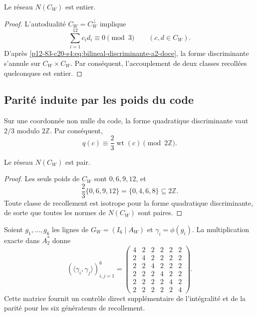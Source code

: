 \begin{lemma}
\label{p12-83-c20-s4:lem:integralidad-pegado-cw}
Le réseau \(N(C_W)\) est entier.
\end{lemma}

\begin{proof}
L'autodualité \(C_W=C_W^\perp\) implique
\[
 \sum_{i=1}^{12}c_id_i\equiv0\pmod3
 \qquad(c,d\in C_W).
\]
D'après \eqref{p12-83-c20-s4:eq:bilineal-discriminante-a2-doce}, la forme discriminante
s'annule sur \(C_W\times C_W\). Par conséquent, l'accouplement de deux classes
recollées quelconques est entier.
\end{proof}

\subsection{Parité induite par les poids du code}

Sur une coordonnée non nulle du code, la forme quadratique discriminante
vaut \(2/3\) modulo \(2\mathbb Z\). Par conséquent,
\begin{equation}
 q(c)\equiv\frac23\operatorname{wt}(c)\pmod{2\mathbb Z}.
 \label{p12-83-c20-s4:eq:cuadratica-discriminante-cw}
\end{equation}

\begin{lemma}
\label{p12-83-c20-s4:lem:paridad-pegado-cw}
Le réseau \(N(C_W)\) est pair.
\end{lemma}

\begin{proof}
Les seuls poids de \(C_W\) sont \(0,6,9,12\), et
\[
 \frac23\{0,6,9,12\}=\{0,4,6,8\}\subseteq2\mathbb Z.
\]
Toute classe de recollement est isotrope pour la forme quadratique discriminante,
de sorte que toutes les normes de \(N(C_W)\) sont paires.
\end{proof}

Soient \(g_1,\ldots,g_6\) les lignes de \(G_W=(I_6\mid A_W)\) et
\(\gamma_i=\phi(g_i)\). La multiplication exacte dans \(A_2^*\) donne
\begin{equation}
 (\langle\gamma_i,\gamma_j\rangle)_{i,j=1}^{6}
 =
 \begin{pmatrix}
 4&2&2&2&2&2\\
 2&4&2&2&2&2\\
 2&2&4&2&2&2\\
 2&2&2&4&2&2\\
 2&2&2&2&4&2\\
 2&2&2&2&2&4
 \end{pmatrix}.
 \label{p12-83-c20-s4:eq:gram-generadores-pegado-cw}
\end{equation}
Cette matrice fournit un contrôle direct supplémentaire de l'intégralité et de la
parité pour les six générateurs de recollement.

